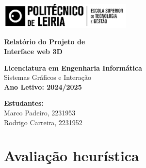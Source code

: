 \documentclass[a4paper,12pt]{article}
\begin{document}
\begin{titlepage}
\begin{center}
    \includegraphics[width=0.5\textwidth]{logo_ipl.png}
\end{center}

\vspace{1cm}

\begin{center}
    \fboxsep=10pt
    \parbox[c][3cm][c]{0.8\textwidth}{
        \centering
        \textbf{\Large Relatório do Projeto de}\\[0.3cm]
        \textbf{\Large Interface web 3D}
    }
\end{center}

\vfill

\begin{center}
    \textbf{Licenciatura em Engenharia Informática}\\
    Sistemas Gráficos e Interação\\[0.5cm]
    \vspace{1cm}
    \textbf{Ano Letivo: 2024/2025}
\end{center}

\vfill

\begin{center}
    \textbf{Estudantes:}\\[0.3cm]
    Marco Padeiro, 2231953\\
    Rodrigo Carreira, 2231952
\end{center}
\thispagestyle{plain}
\end{titlepage}

\newpage
\tableofcontents

\newpage
\section{Avaliação heurística}
\end{document}
